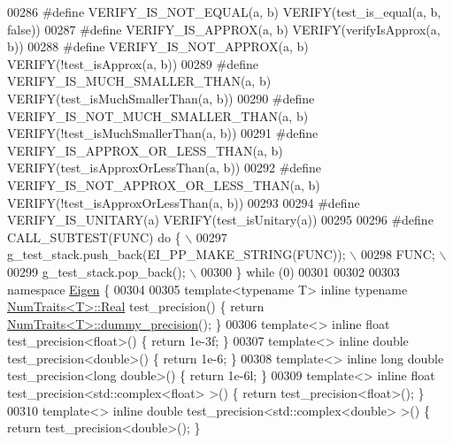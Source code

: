 \begin{DoxyCode}
00286 \textcolor{preprocessor}{#define VERIFY\_IS\_NOT\_EQUAL(a, b) VERIFY(test\_is\_equal(a, b, false))}
00287 \textcolor{preprocessor}{#define VERIFY\_IS\_APPROX(a, b) VERIFY(verifyIsApprox(a, b))}
00288 \textcolor{preprocessor}{#define VERIFY\_IS\_NOT\_APPROX(a, b) VERIFY(!test\_isApprox(a, b))}
00289 \textcolor{preprocessor}{#define VERIFY\_IS\_MUCH\_SMALLER\_THAN(a, b) VERIFY(test\_isMuchSmallerThan(a, b))}
00290 \textcolor{preprocessor}{#define VERIFY\_IS\_NOT\_MUCH\_SMALLER\_THAN(a, b) VERIFY(!test\_isMuchSmallerThan(a, b))}
00291 \textcolor{preprocessor}{#define VERIFY\_IS\_APPROX\_OR\_LESS\_THAN(a, b) VERIFY(test\_isApproxOrLessThan(a, b))}
00292 \textcolor{preprocessor}{#define VERIFY\_IS\_NOT\_APPROX\_OR\_LESS\_THAN(a, b) VERIFY(!test\_isApproxOrLessThan(a, b))}
00293 
00294 \textcolor{preprocessor}{#define VERIFY\_IS\_UNITARY(a) VERIFY(test\_isUnitary(a))}
00295 
00296 \textcolor{preprocessor}{#define CALL\_SUBTEST(FUNC) do \{ \(\backslash\)}
00297 \textcolor{preprocessor}{    g\_test\_stack.push\_back(EI\_PP\_MAKE\_STRING(FUNC)); \(\backslash\)}
00298 \textcolor{preprocessor}{    FUNC; \(\backslash\)}
00299 \textcolor{preprocessor}{    g\_test\_stack.pop\_back(); \(\backslash\)}
00300 \textcolor{preprocessor}{  \} while (0)}
00301 
00302 
00303 \textcolor{keyword}{namespace }\hyperlink{namespace_eigen}{Eigen} \{
00304 
00305 \textcolor{keyword}{template}<\textcolor{keyword}{typename} T> \textcolor{keyword}{inline} \textcolor{keyword}{typename} \hyperlink{group___sparse_core___module}{NumTraits<T>::Real} test\_precision() \{ \textcolor{keywordflow}{return} 
      \hyperlink{group___core___module_struct_eigen_1_1_num_traits}{NumTraits<T>::dummy\_precision}(); \}
00306 \textcolor{keyword}{template}<> \textcolor{keyword}{inline} \textcolor{keywordtype}{float} test\_precision<float>() \{ \textcolor{keywordflow}{return} 1e-3f; \}
00307 \textcolor{keyword}{template}<> \textcolor{keyword}{inline} \textcolor{keywordtype}{double} test\_precision<double>() \{ \textcolor{keywordflow}{return} 1e-6; \}
00308 \textcolor{keyword}{template}<> \textcolor{keyword}{inline} \textcolor{keywordtype}{long} \textcolor{keywordtype}{double} test\_precision<long double>() \{ \textcolor{keywordflow}{return} 1e-6l; \}
00309 \textcolor{keyword}{template}<> \textcolor{keyword}{inline} \textcolor{keywordtype}{float} test\_precision<std::complex<float> >() \{ \textcolor{keywordflow}{return} test\_precision<float>(); \}
00310 \textcolor{keyword}{template}<> \textcolor{keyword}{inline} \textcolor{keywordtype}{double} test\_precision<std::complex<double> >() \{ \textcolor{keywordflow}{return} test\_precision<double>(); \}

\end{DoxyCode}
